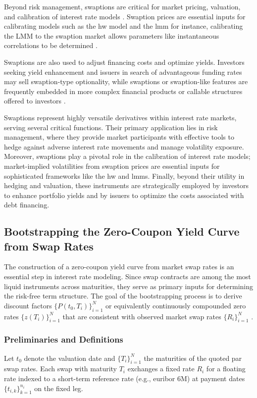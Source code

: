 Beyond risk management, swaptions are critical for market pricing, valuation, and calibration of interest rate models \parencite[pp.~132--136]{brigo2006interest}.  Swaption prices are essential inputs for calibrating models such as the \ac{hw} model \parencite{kladivko2023mlehullwhite} and the \ac{lmm} for instance, calibrating the LMM to the swaption market allows parameters like instantaneous correlations to be determined \parencite[p.~290]{brigo2006interest}.

Swaptions are also used to adjust financing costs and optimize yields. Investors seeking yield enhancement and issuers in search of advantageous funding rates may sell swaption-type optionality, while swaptions or swaption-like features are frequently embedded in more complex financial products or callable structures offered to investors \parencite[p.~22]{rebonato2004interest}.

Swaptions represent highly versatile derivatives within interest rate markets, serving several critical functions. Their primary application lies in risk management, where they provide market participants with effective tools to hedge against adverse interest rate movements and manage volatility exposure. Moreover, swaptions play a pivotal role in the calibration of interest rate models; market-implied volatilities from swaption prices are essential inputs for sophisticated frameworks like the \ac{hw} and \ac{lmm}s. Finally, beyond their utility in hedging and valuation, these instruments are strategically employed by investors to enhance portfolio yields and by issuers to optimize the costs associated with debt financing.

\subsection{Bootstrapping the Zero-Coupon Yield Curve from Swap Rates}
\label{subsec:bootstrap_zero_curve}
The construction of a zero-coupon yield curve from market swap rates is an essential step in interest rate modeling. Since swap contracts are among the most liquid instruments across maturities, they serve as primary inputs for determining the risk-free term structure. The goal of the bootstrapping process is to derive discount factors $\{P(t_0, T_i)\}_{i=1}^N$ or equivalently continuously compounded zero rates $\{z(T_i)\}_{i=1}^N$ that are consistent with observed market swap rates $\{R_i\}_{i=1}^N$ \parencite[pp.~84--86]{hull2015optionsfutures}.

\subsubsection{Preliminaries and Definitions}
Let $t_0$ denote the valuation date and $\{T_i\}_{i=1}^N$ the maturities of the quoted par swap rates. Each swap with maturity $T_i$ exchanges a fixed rate $R_i$ for a floating rate indexed to a short-term reference rate (e.g., \ac{euribor} 6M) at payment dates $\{t_{i,k}\}_{k=1}^{n_i}$ on the fixed leg.

